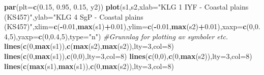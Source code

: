 \documentclass[]{article}
\newenvironment{Shaded}{\begin{snugshade}}{\end{snugshade}}
\newcommand{\CommentTok}[1]{\textcolor[rgb]{0.56,0.35,0.01}{\textit{#1}}}
\newcommand{\DataTypeTok}[1]{\textcolor[rgb]{0.13,0.29,0.53}{#1}}
\newcommand{\DecValTok}[1]{\textcolor[rgb]{0.00,0.00,0.81}{#1}}
\newcommand{\FloatTok}[1]{\textcolor[rgb]{0.00,0.00,0.81}{#1}}
\newcommand{\KeywordTok}[1]{\textcolor[rgb]{0.13,0.29,0.53}{\textbf{#1}}}
\newcommand{\NormalTok}[1]{#1}
\newcommand{\OperatorTok}[1]{\textcolor[rgb]{0.81,0.36,0.00}{\textbf{#1}}}
\newcommand{\StringTok}[1]{\textcolor[rgb]{0.31,0.60,0.02}{#1}}
\begin{document}
\begin{Shaded}
\begin{Highlighting}[]
\KeywordTok{par}\NormalTok{(}\DataTypeTok{plt=}\KeywordTok{c}\NormalTok{(}\FloatTok{0.15}\NormalTok{, }\FloatTok{0.95}\NormalTok{, }\FloatTok{0.15}\NormalTok{, y2))}
\KeywordTok{plot}\NormalTok{(s1,s2,}\DataTypeTok{xlab=}\StringTok{"KLG 1 IYF - Coastal plains (KS457)"}\NormalTok{,}\DataTypeTok{ylab=}\StringTok{"KLG 4 SgP - Coastal plains (KS457)"}\NormalTok{,}\DataTypeTok{xlim=}\KeywordTok{c}\NormalTok{(}\OperatorTok{-}\FloatTok{0.01}\NormalTok{,}\KeywordTok{max}\NormalTok{(s1)}\OperatorTok{+}\FloatTok{0.01}\NormalTok{),}\DataTypeTok{ylim=}\KeywordTok{c}\NormalTok{(}\OperatorTok{-}\FloatTok{0.01}\NormalTok{,}\KeywordTok{max}\NormalTok{(s2)}\OperatorTok{+}\FloatTok{0.01}\NormalTok{),}\DataTypeTok{xaxp=}\KeywordTok{c}\NormalTok{(}\DecValTok{0}\NormalTok{,}\FloatTok{0.4}\NormalTok{,}\DecValTok{5}\NormalTok{),}\DataTypeTok{yaxp=}\KeywordTok{c}\NormalTok{(}\DecValTok{0}\NormalTok{,}\FloatTok{0.4}\NormalTok{,}\DecValTok{5}\NormalTok{),}\DataTypeTok{type=}\StringTok{"n"}\NormalTok{) }\CommentTok{#Grunnlag for plotting av symboler etc.}
\KeywordTok{lines}\NormalTok{(}\KeywordTok{c}\NormalTok{(}\DecValTok{0}\NormalTok{,}\KeywordTok{max}\NormalTok{(s1)),}\KeywordTok{c}\NormalTok{(}\KeywordTok{max}\NormalTok{(s2),}\KeywordTok{max}\NormalTok{(s2)),}\DataTypeTok{lty=}\DecValTok{3}\NormalTok{,}\DataTypeTok{col=}\DecValTok{8}\NormalTok{)}
\KeywordTok{lines}\NormalTok{(}\KeywordTok{c}\NormalTok{(}\DecValTok{0}\NormalTok{,}\KeywordTok{max}\NormalTok{(s1)),}\KeywordTok{c}\NormalTok{(}\DecValTok{0}\NormalTok{,}\DecValTok{0}\NormalTok{),}\DataTypeTok{lty=}\DecValTok{3}\NormalTok{,}\DataTypeTok{col=}\DecValTok{8}\NormalTok{)}
\KeywordTok{lines}\NormalTok{(}\KeywordTok{c}\NormalTok{(}\DecValTok{0}\NormalTok{,}\DecValTok{0}\NormalTok{),}\KeywordTok{c}\NormalTok{(}\DecValTok{0}\NormalTok{,}\KeywordTok{max}\NormalTok{(s2)),}\DataTypeTok{lty=}\DecValTok{3}\NormalTok{,}\DataTypeTok{col=}\DecValTok{8}\NormalTok{)}
\KeywordTok{lines}\NormalTok{(}\KeywordTok{c}\NormalTok{(}\KeywordTok{max}\NormalTok{(s1),}\KeywordTok{max}\NormalTok{(s1)),}\KeywordTok{c}\NormalTok{(}\DecValTok{0}\NormalTok{,}\KeywordTok{max}\NormalTok{(s2)),}\DataTypeTok{lty=}\DecValTok{3}\NormalTok{,}\DataTypeTok{col=}\DecValTok{8}\NormalTok{)}


\end{Highlighting}
\end{Shaded}
\end{document}
